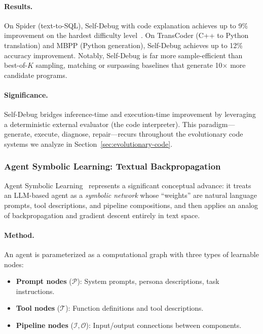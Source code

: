 \paragraph{Results.}
On Spider (text-to-SQL), Self-Debug with code explanation achieves up to 9\% improvement on the hardest difficulty level~\citep{chen2023selfdebug}. On TransCoder (C++ to Python translation) and MBPP (Python generation), Self-Debug achieves up to 12\% accuracy improvement. Notably, Self-Debug is far more sample-efficient than best-of-$K$ sampling, matching or surpassing baselines that generate 10$\times$ more candidate programs.

\paragraph{Significance.}
Self-Debug bridges inference-time and execution-time improvement by leveraging a deterministic external evaluator (the code interpreter). This paradigm---generate, execute, diagnose, repair---recurs throughout the evolutionary code systems we analyze in Section~\ref{sec:evolutionary-code}.

\subsubsection{Agent Symbolic Learning: Textual Backpropagation}
\label{sec:symbolic-learning}

Agent Symbolic Learning~\citep{zhou2024symbolic} represents a significant conceptual advance: it treats an LLM-based agent as a \emph{symbolic network} whose ``weights'' are natural language prompts, tool descriptions, and pipeline compositions, and then applies an analog of backpropagation and gradient descent entirely in text space.

\paragraph{Method.}
An agent is parameterized as a computational graph with three types of learnable nodes:
\begin{itemize}
    \item \textbf{Prompt nodes} ($\mathcal{P}$): System prompts, persona descriptions, task instructions.
    \item \textbf{Tool nodes} ($\mathcal{T}$): Function definitions and tool descriptions.
    \item \textbf{Pipeline nodes} ($\mathcal{I}, \mathcal{O}$): Input/output connections between components.
\end{itemize}

